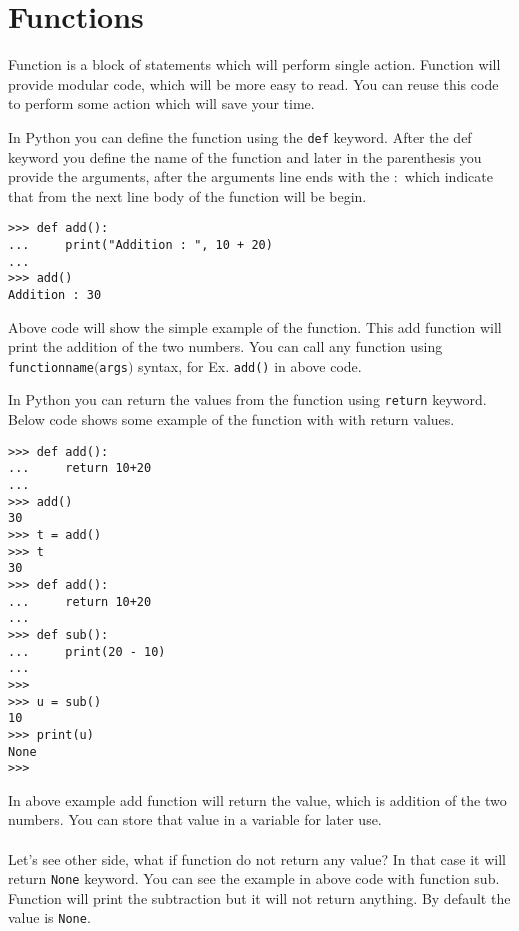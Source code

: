 \documentclass[letterpaper,12pt]{book}
\begin{document}
\section{Functions}
Function is a block of statements which will perform single action. Function will provide modular code, which will be more easy to read. You can reuse this code to perform some action which will save your time.

In Python you can define the function using the \texttt{def} keyword. 
After the def keyword you define the name of the function and later in the parenthesis you provide the arguments, after the arguments line ends with the \texttt{$:$} which indicate that from the next line body of the function will be begin.
\begin{verbatim}
>>> def add():
...     print("Addition : ", 10 + 20)
... 
>>> add()
Addition : 30
\end{verbatim}
Above code will show the simple example of the function. This add function will print the addition of the two numbers. You can call any function using \texttt{function\textunderscore name$($args$)$} syntax, for Ex. \texttt{add()} in above code.

In Python you can return the values from the function using \texttt{return} keyword. Below code shows some example of the function with with return values.
\begin{verbatim}
>>> def add():
...     return 10+20
... 
>>> add()
30
>>> t = add()
>>> t
30
>>> def add():
...     return 10+20
... 
>>> def sub():
...     print(20 - 10)
... 
>>> 
>>> u = sub()
10
>>> print(u)
None
>>> 
\end{verbatim}
In above example add function will return the value, which is addition of the two numbers. You can store that value in a variable for later use. 
\paragraph{}
Let's see other side, what if function do not return any value? In that case it will return \texttt{None} keyword. You can see the example in above code with function sub. Function will print the subtraction but it will not return anything. By default the value is \texttt{None}.
\end{document}
